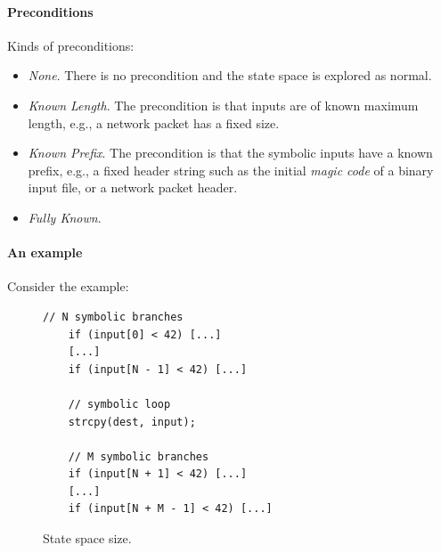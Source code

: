 \paragraph{Preconditions} Kinds of preconditions:
\begin{itemize}
\item {\em None}. There is no precondition and the state space is explored as normal.
\item {\em Known Length}. The precondition is that inputs are of known maximum length, e.g., a network packet has a fixed size.
\item {\em Known Prefix}. The precondition is that the symbolic inputs have a known prefix, e.g., a fixed header string such as the initial {\em magic code} of a binary input file, or a network packet header.
\item {\em Fully Known}. 
\end{itemize}

\paragraph{An example} Consider the example:

\begin{figure}[t]
\begin{small}
\begin{lstlisting}[basicstyle=\ttfamily\small]
    // N symbolic branches 
    if (input[0] < 42) [...]
    [...]
    if (input[N - 1] < 42) [...]

    // symbolic loop
    strcpy(dest, input); 

    // M symbolic branches
    if (input[N + 1] < 42) [...]
    [...]
    if (input[N + M - 1] < 42) [...]
\end{lstlisting}
\end{small}
\caption{State space size.}
\label{fig:state-space-size}
\end{figure}

